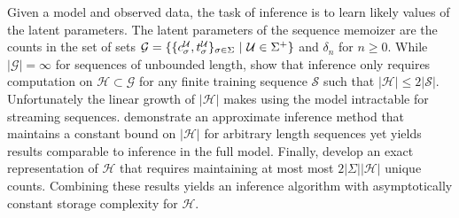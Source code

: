 
Given a model and observed data,  the task of inference is to learn likely values of the latent parameters.  The latent parameters of the sequence memoizer are the counts in the set of sets  $\mathcal{G} = \{ \{ c^\U_\sigma, t^\U_\sigma \}_{\sigma \in \Sigma} \ | \ \U \in \Sigma^{+} \}$  and $\delta_n$ for $n \geq 0$.  While $| \mathcal{G}| = \infty$ for sequences of unbounded length, \citep{Wood2009} show that inference only requires computation on $\mathcal{H} \subset \mathcal{G}$ for any finite training sequence $\mathcal{S}$ such that $|\mathcal{H} | \leq 2 |\mathcal{S}|$.  
Unfortunately the linear growth of $|\mathcal{H}|$ makes using the model intractable for streaming sequences. \citep{Bartlett2010} demonstrate an approximate inference method that maintains a constant bound on $|\mathcal{H}| $ for arbitrary length sequences yet yields results comparable to inference in the full model.  Finally, \cite{Gasthaus2011} develop an exact representation of $\mathcal{H}$ that requires maintaining at most most $2|\Sigma| |\mathcal{H}|$ unique counts. Combining these results yields an inference algorithm with asymptotically constant storage complexity for $\mathcal{H}$.  

